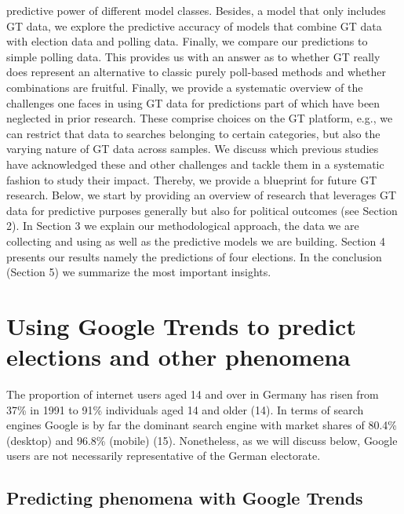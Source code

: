 \documentclass[
  letterpaper,
  DIV=11,
  numbers=noendperiod]{scrartcl}
\begin{document}
predictive power of different model classes. Besides, a model that only
includes GT data, we explore the predictive accuracy of models that
combine GT data with election data and polling data. Finally, we compare
our predictions to simple polling data. This provides us with an answer
as to whether GT really does represent an alternative to classic purely
poll-based methods and whether combinations are fruitful. Finally, we
provide a systematic overview of the challenges one faces in using GT
data for predictions part of which have been neglected in prior
research. These comprise choices on the GT platform, e.g., we can
restrict that data to searches belonging to certain categories, but also
the varying nature of GT data across samples. We discuss which previous
studies have acknowledged these and other challenges and tackle them in
a systematic fashion to study their impact. Thereby, we provide a
blueprint for future GT research. Below, we start by providing an
overview of research that leverages GT data for predictive purposes
generally but also for political outcomes (see Section 2). In Section 3
we explain our methodological approach, the data we are collecting and
using as well as the predictive models we are building. Section 4
presents our results namely the predictions of four elections. In the
conclusion (Section 5) we summarize the most important insights.

\hypertarget{using-google-trends-to-predict-elections-and-other-phenomena}{%
\section{Using Google Trends to predict elections and other
phenomena}\label{using-google-trends-to-predict-elections-and-other-phenomena}}

The proportion of internet users aged 14 and over in Germany has risen
from 37\% in 1991 to 91\% individuals aged 14 and older (14). In terms
of search engines Google is by far the dominant search engine with
market shares of 80.4\% (desktop) and 96.8\% (mobile) (15). Nonetheless,
as we will discuss below, Google users are not necessarily
representative of the German electorate.

\hypertarget{predicting-phenomena-with-google-trends}{%
\subsection{Predicting phenomena with Google
Trends}\label{predicting-phenomena-with-google-trends}}
\end{document}
